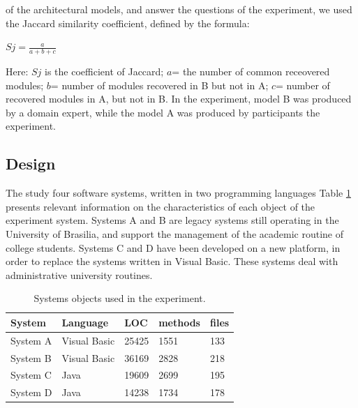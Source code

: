 \documentclass{sig-alternate-05-2015}
\begin{document}
 of the  architectural models, 
and answer the questions of the experiment, we used the 
Jaccard similarity coefficient, defined by the formula:

\begin{center}
	$Sj= \frac{a}{a+b+c}$
\end{center}

Here: $Sj$ is the coefficient of Jaccard; $a$= the number of common receovered 
modules; $b$= number of modules recovered in B but not in A; $c$= number of recovered 
modules in A, but not in B. In the experiment, model B was produced by a domain expert, while the model 
A was produced by participants  the experiment.

\subsection{Design}%



The study  four software systems, written in 
two programming languages  
Table \ref{tabelaSistemasObjetos}  presents relevant information on 
the characteristics of each object of the experiment system. Systems A 
and B are legacy systems still operating in the University of Brasilia, 
and support the management of the academic routine of college students. 
Systems C and D have been developed on a new platform, in order 
to replace the systems written in Visual Basic. These systems 
deal with administrative university routines.

\begin{table}[h]
	\centering
	\caption{Systems objects used in the experiment.}
	\label{tabelaSistemasObjetos}
	\begin{tabular}{|lllll|}
		\hline
		System  & Language    & LOC   &  methods & files  \\ \hline
		System A             & Visual Basic & 25425 & 1551       & 133        \\
		System B           & Visual Basic & 36169 & 2828       & 218        \\
		System C            & Java         & 19609 & 2699       & 195        \\
		System D           & Java         & 14238 & 1734       & 178        \\ \hline
	\end{tabular}
\end{table}
\end{document}
